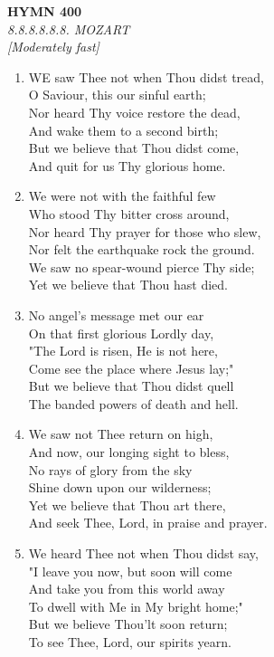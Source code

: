 \documentclass[11pt,a4paper]{article}
\begin{document}
\newpage
\begin{center}
    {\Large \textbf{HYMN 400}}
    \\
    \textit{8.8.8.8.8.8. MOZART}
    \\
    \textit{\small [Moderately fast]}
\end{center}
\vspace{1em}

\begin{enumerate}
    \item WE saw Thee not when Thou didst tread, \\
        O Saviour, this our sinful earth; \\
        Nor heard Thy voice restore the dead, \\
        And wake them to a second birth; \\
        But we believe that Thou didst come, \\
        And quit for us Thy glorious home.

    \item We were not with the faithful few \\
        Who stood Thy bitter cross around, \\
        Nor heard Thy prayer for those who slew, \\
        Nor felt the earthquake rock the ground. \\
        We saw no spear-wound pierce Thy side; \\
        Yet we believe that Thou hast died.

    \item No angel's message met our ear \\
        On that first glorious Lordly day, \\
        "The Lord is risen, He is not here, \\
        Come see the place where Jesus lay;" \\
        But we believe that Thou didst quell \\
        The banded powers of death and hell.

    \item We saw not Thee return on high, \\
        And now, our longing sight to bless, \\
        No rays of glory from the sky \\
        Shine down upon our wilderness; \\
        Yet we believe that Thou art there, \\
        And seek Thee, Lord, in praise and prayer.

    \item We heard Thee not when Thou didst say, \\
        "I leave you now, but soon will come \\
        And take you from this world away \\
        To dwell with Me in My bright home;" \\
        But we believe Thou'lt soon return; \\
        To see Thee, Lord, our spirits yearn.

\end{enumerate}
\end{document}
